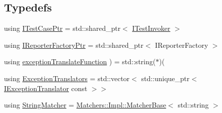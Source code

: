 \subsection*{Typedefs}
\begin{DoxyCompactItemize}
\item 
using \hyperlink{namespace_catch_afa04ebe8e9423240c9585f7101a82ddf}{I\-Test\-Case\-Ptr} = std\-::shared\-\_\-ptr$<$ \hyperlink{struct_catch_1_1_i_test_invoker}{I\-Test\-Invoker} $>$
\item 
using \hyperlink{namespace_catch_ad1b36ac40c2739e52fd453dcdddf0d09}{I\-Reporter\-Factory\-Ptr} = std\-::shared\-\_\-ptr$<$ I\-Reporter\-Factory $>$
\item 
using \hyperlink{namespace_catch_ae1eb414b7cb69238d2be7c073e7be031}{exception\-Translate\-Function} ) = std\-::string($\ast$)(
\item 
using \hyperlink{namespace_catch_a86864e320fea8e13a9b27ac3894a9959}{Exception\-Translators} = std\-::vector$<$ std\-::unique\-\_\-ptr$<$ \hyperlink{struct_catch_1_1_i_exception_translator}{I\-Exception\-Translator} const  $>$$>$
\item 
using \hyperlink{namespace_catch_aba438977e831821a2eeca82b9b4f4af2}{String\-Matcher} = \hyperlink{struct_catch_1_1_matchers_1_1_impl_1_1_matcher_base}{Matchers\-::\-Impl\-::\-Matcher\-Base}$<$ std\-::string $>$
\end{DoxyCompactItemize}
